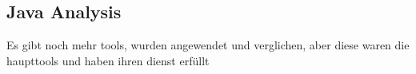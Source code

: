 \subsection{Java Analysis} \label{subsubsection:forensics-tools-java}





Es gibt noch mehr tools, wurden angewendet und verglichen, aber diese waren die haupttools und haben ihren dienst erfüllt
